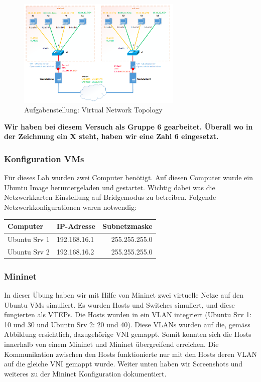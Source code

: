 \documentclass[a4,12pt]{scrartcl}
\begin{document}
\begin{figure} [H]
	\begin{center}
	\includegraphics[width=0.70\textwidth]{./pictures/vxlan_config.png}
	\caption{Aufgabenstellung: Virtual Network Topology}
	\label{x}
	\end{center}
\end{figure}
\noindent \textbf{Wir haben bei diesem Versuch als Gruppe 6 gearbeitet. Überall wo in der Zeichnung ein X steht, haben wir eine Zahl 6 eingesetzt.}

\subsubsection{Konfiguration VMs}
Für dieses Lab wurden zwei Computer benötigt. Auf diesen Computer wurde ein Ubuntu Image heruntergeladen und gestartet. Wichtig dabei was die Netzwerkkarten Einstellung auf Bridgemodus zu betreiben. Folgende Netzwerkkonfigurationen waren notwendig: 
\begin{center}
    \begin{tabular}{@{} l l r@{}}\toprule    
    {Computer} & {IP-Adresse} & {Subnetzmaske}\\ \midrule
    Ubuntu Srv 1 & 192.168.16.1 & 255.255.255.0\\ \addlinespace
    Ubuntu Srv 2 & 192.168.16.2 & 255.255.255.0\\ 
    \bottomrule
    \end{tabular}
\end{center}

\subsubsection{Mininet}
In dieser Übung haben wir mit Hilfe von Mininet zwei virtuelle Netze auf den Ubuntu VMs simuliert. Es wurden Hosts und Switches simuliert, und diese fungierten als VTEPs. Die Hosts wurden in ein VLAN integriert (Ubuntu Srv 1: 10 und 30 und Ubuntu Srv 2: 20 und 40). Diese VLANs wurden auf die, gemäss Abbildung ersichtlich, dazugehörige VNI gemappt. Somit konnten sich die Hosts innerhalb von einem Mininet und Mininet übergreifend erreichen. Die Kommunikation zwischen den Hosts funktionierte nur mit den Hosts deren VLAN auf die gleiche VNI gemappt wurde. Weiter unten haben wir Screenshots und weiteres zu der Mininet Konfiguration dokumentiert. 
\end{document}
